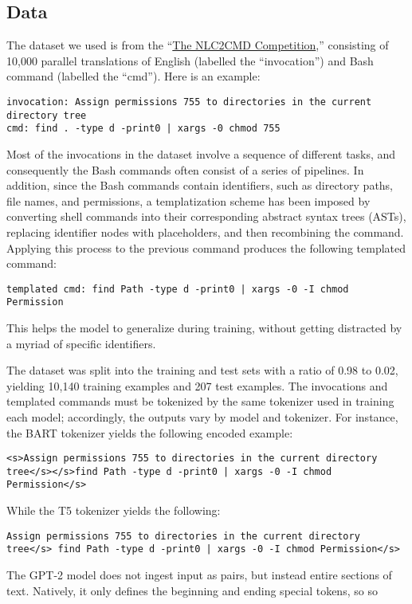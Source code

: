 \subsection{Data}
The dataset we used is from the
``\href{https://nlc2cmd.us-east.mybluemix.net/}{The NLC2CMD Competition},''
consisting of 10,000 parallel translations of English (labelled the
``invocation'') and Bash command (labelled the ``cmd''). Here is an example:
\begin{verbatim}
invocation: Assign permissions 755 to directories in the current directory tree
cmd: find . -type d -print0 | xargs -0 chmod 755
\end{verbatim}
Most of the invocations in the dataset involve a sequence of different tasks,
and consequently the Bash commands often consist of a series of pipelines. In
addition, since the Bash commands contain identifiers, such as directory paths,
file names, and permissions, a templatization scheme has been imposed by
converting shell commands into their corresponding abstract syntax trees
(ASTs), replacing identifier nodes with placeholders, and then recombining the
command. Applying this process to the previous command produces the following
templated command:
\begin{verbatim}
templated cmd: find Path -type d -print0 | xargs -0 -I chmod Permission
\end{verbatim}
This helps the model to generalize during training, without getting distracted
by a myriad of specific identifiers.
\par
The dataset was split into the training and test sets with a ratio of 0.98 to 0.02, yielding 10,140 training examples and 207 test examples. The invocations and templated commands must be tokenized by the same tokenizer used in training each model; accordingly, the outputs vary by model and tokenizer. For instance, the BART tokenizer yields the following encoded example:
\begin{verbatim}
<s>Assign permissions 755 to directories in the current directory 
tree</s></s>find Path -type d -print0 | xargs -0 -I chmod Permission</s>
\end{verbatim}
While the T5 tokenizer yields the following:
\begin{verbatim}
Assign permissions 755 to directories in the current directory 
tree</s> find Path -type d -print0 | xargs -0 -I chmod Permission</s>
\end{verbatim}
The GPT-2 model does not ingest input as pairs, but instead entire sections of
text. Natively, it only defines the beginning and ending special tokens, so so
